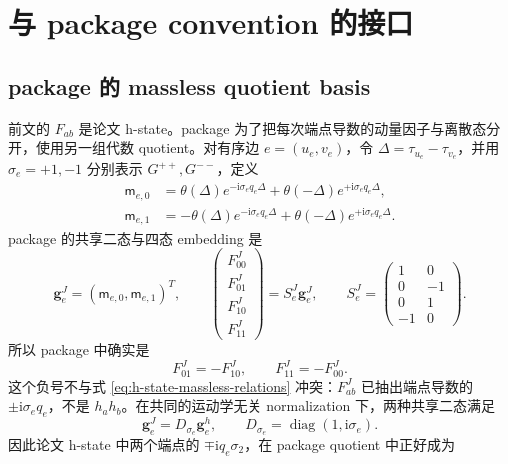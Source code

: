 \documentclass[11pt,a4paper]{ctexart}
\newcommand{\ii}{\mathrm i}
\begin{document}
\section{与 package convention 的接口}
\label{sec:package-adapter}

\subsection{package 的 massless quotient basis}

前文的 $F_{ab}$ 是论文 h-state。package 为了把每次端点导数的动量因子与离散态分开，使用另一组代数 quotient。对有序边 $e=(u_e,v_e)$，令 $\Delta=\tau_{u_e}-\tau_{v_e}$，并用 $\sigma_e=+1,-1$ 分别表示 $G^{++},G^{--}$，定义
\begin{align}
 \mathsf m_{e,0}&=\theta(\Delta)e^{-\ii\sigma_eq_e\Delta}
       +\theta(-\Delta)e^{+\ii\sigma_eq_e\Delta},\\
 \mathsf m_{e,1}&=-\theta(\Delta)e^{-\ii\sigma_eq_e\Delta}
       +\theta(-\Delta)e^{+\ii\sigma_eq_e\Delta}.
 \label{eq:package-M01}
\end{align}
package 的共享二态与四态 embedding 是
\begin{equation}
 \bm g_e^J=(\mathsf m_{e,0},\mathsf m_{e,1})^T,
 \qquad
 \begin{pmatrix}F^J_{00}\\F^J_{01}\\F^J_{10}\\F^J_{11}\end{pmatrix}
 =S_e^J\bm g_e^J,
 \qquad
 S_e^J=
 \begin{pmatrix}
  1&0\\0&-1\\0&1\\-1&0
 \end{pmatrix}.
 \label{eq:package-S-massless}
\end{equation}
所以 package 中确实是
\begin{equation}
 F^J_{01}=-F^J_{10},
 \qquad
 F^J_{11}=-F^J_{00}.
 \label{eq:package-quotient-relations}
\end{equation}
这个负号不与式 \eqref{eq:h-state-massless-relations} 冲突：$F^J_{ab}$ 已抽出端点导数的 $\pm\ii\sigma_eq_e$，不是 $h_a h_b$。在共同的运动学无关 normalization 下，两种共享二态满足
\begin{equation}
 \bm g_e^J=D_{\sigma_e}\bm g_e^h,
 \qquad
 D_{\sigma_e}=\operatorname{diag}(1,\ii\sigma_e).
 \label{eq:h-to-package-basis}
\end{equation}
因此论文 h-state 中两个端点的 $\mp\ii q_e\sigma_2$，在 package quotient 中正好成为
\end{document}
